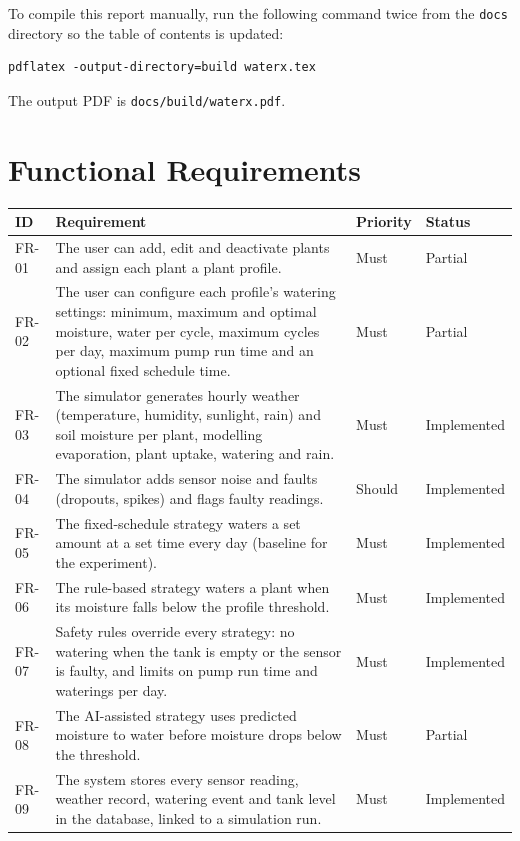 \documentclass[11pt,a4paper]{article}
\newcommand{\cn}[1]{\texttt{#1}}   %
\begin{document}
To compile this report manually, run the following command twice from the
\cn{docs} directory so the table of contents is updated:
\begin{verbatim}
pdflatex -output-directory=build waterx.tex
\end{verbatim}
The output PDF is \cn{docs/build/waterx.pdf}.

\section{Functional Requirements}
\begin{xltabular}{\textwidth}{@{}l Y l l@{}}
  \toprule
  \textbf{ID} & \textbf{Requirement} & \textbf{Priority} & \textbf{Status}\\
  \midrule
  \endhead
  FR-01 & The user can add, edit and deactivate plants and assign each plant a plant profile. & Must & Partial\\
  FR-02 & The user can configure each profile's watering settings: minimum, maximum and optimal moisture, water per cycle, maximum cycles per day, maximum pump run time and an optional fixed schedule time. & Must & Partial\\
  FR-03 & The simulator generates hourly weather (temperature, humidity, sunlight, rain) and soil moisture per plant, modelling evaporation, plant uptake, watering and rain. & Must & Implemented\\
  FR-04 & The simulator adds sensor noise and faults (dropouts, spikes) and flags faulty readings. & Should & Implemented\\
  FR-05 & The fixed-schedule strategy waters a set amount at a set time every day (baseline for the experiment). & Must & Implemented\\
  FR-06 & The rule-based strategy waters a plant when its moisture falls below the profile threshold. & Must & Implemented\\
  FR-07 & Safety rules override every strategy: no watering when the tank is empty or the sensor is faulty, and limits on pump run time and waterings per day. & Must & Implemented\\
  FR-08 & The AI-assisted strategy uses predicted moisture to water before moisture drops below the threshold. & Must & Partial\\
  FR-09 & The system stores every sensor reading, weather record, watering event and tank level in the database, linked to a simulation run. & Must & Implemented\\

\end{xltabular}
\end{document}
